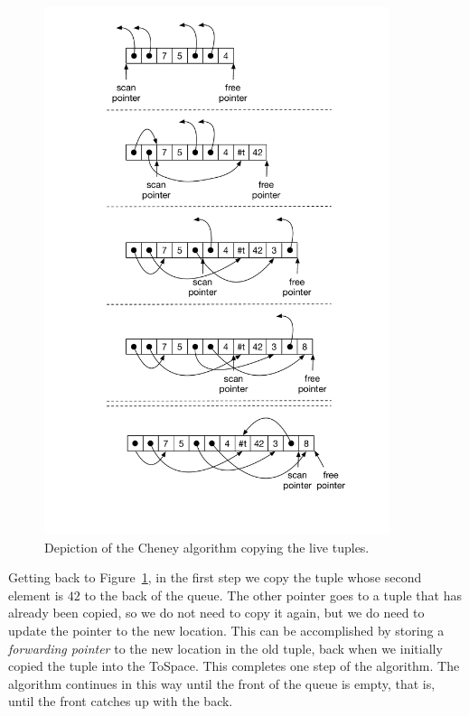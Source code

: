 \documentclass[11pt]{book}
\begin{document}
\begin{figure}[tbp]
\centering \includegraphics[width=0.9\textwidth]{figs/cheney}
\caption{Depiction of the Cheney algorithm copying the live tuples.}
\label{fig:cheney}
\end{figure}

Getting back to Figure~\ref{fig:cheney}, in the first step we copy the
tuple whose second element is $42$ to the back of the queue. The other
pointer goes to a tuple that has already been copied, so we do not
need to copy it again, but we do need to update the pointer to the new
location. This can be accomplished by storing a \emph{forwarding
pointer} to the new location in the old tuple, back when we initially
copied the tuple into the ToSpace. This completes one step of the
algorithm. The algorithm continues in this way until the front of the
queue is empty, that is, until the front catches up with the back.
\end{document}
